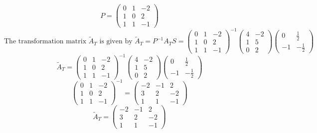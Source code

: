 \documentclass[a3paper,12pt]{extarticle} %
\begin{document}
\begin{enumerate}
\begin{enumerate}
\[        \]
        \[
            P = \begin{pmatrix} 0 & 1 & -2 \\ 1 & 0 & 2 \\ 1 & 1 & -1 \end{pmatrix}
        \]
        \[
            \text{The transformation matrix } \tilde{A}_T \text{ is given by } \tilde{A}_T = P^{-1}A_TS = \begin{pmatrix} 0 & 1 & -2 \\ 1 & 0 & 2 \\ 1 & 1 & -1 \end{pmatrix}^{-1} \begin{pmatrix} 4 & -2 \\ 1 & 5 \\ 0 & 2 \end{pmatrix} \begin{pmatrix} 0 & \frac{1}{2} \\ -1 & -\frac{1}{2} \end{pmatrix}
        \]
        \[
            \tilde{A}_T = \begin{pmatrix} 0 & 1 & -2 \\ 1 & 0 & 2 \\ 1 & 1 & -1 \end{pmatrix}^{-1} \begin{pmatrix} 4 & -2 \\ 1 & 5 \\ 0 & 2 \end{pmatrix} \begin{pmatrix} 0 & \frac{1}{2} \\ -1 & -\frac{1}{2} \end{pmatrix}
        \]
        \[
           \begin{pmatrix}
                0 & 1 & -2 \\
                1 & 0 & 2 \\
                1 & 1 & -1
            \end{pmatrix}^{-1} = \begin{pmatrix}
                -2 & -1 & 2 \\
                3 & 2 & -2 \\
                1 & 1 & -1
            \end{pmatrix}
        \]
        \[
            \tilde{A}_T = \begin{pmatrix}
                -2 & -1 & 2 \\
                3 & 2 & -2 \\
                1 & 1 & -1

\end{pmatrix}\]
\end{enumerate}
\end{enumerate}
\end{document}
